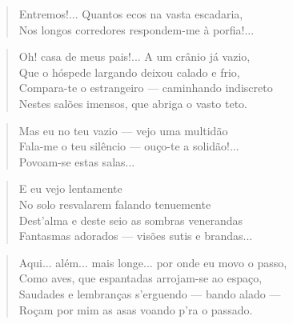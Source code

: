 \begin{anexosenv}
\begin{verse}
Entremos!... Quantos ecos na vasta escadaria, \\
Nos longos corredores respondem-me à porfia!... \\
\end{verse}

\begin{verse}
Oh! casa de meus pais!... A um crânio já vazio, \\
Que o hóspede largando deixou calado e frio, \\
Compara-te o estrangeiro — caminhando indiscreto \\
Nestes salões imensos, que abriga o vasto teto. \\
\end{verse}

\begin{verse}
Mas eu no teu vazio — vejo uma multidão \\
Fala-me o teu silêncio — ouço-te a solidão!... \\
Povoam-se estas salas... \\
\end{verse}

\begin{verse}
E eu vejo lentamente \\
No solo resvalarem falando tenuemente \\
Dest'alma e deste seio as sombras venerandas \\
Fantasmas adorados — visões sutis e brandas... \\
\end{verse}

\begin{verse}
Aqui... além... mais longe... por onde eu movo o passo, \\
Como aves, que espantadas arrojam-se ao espaço, \\
Saudades e lembranças s'erguendo — bando alado — \\
Roçam por mim as asas voando p'ra o passado. \\
\end{verse}


\end{anexosenv}